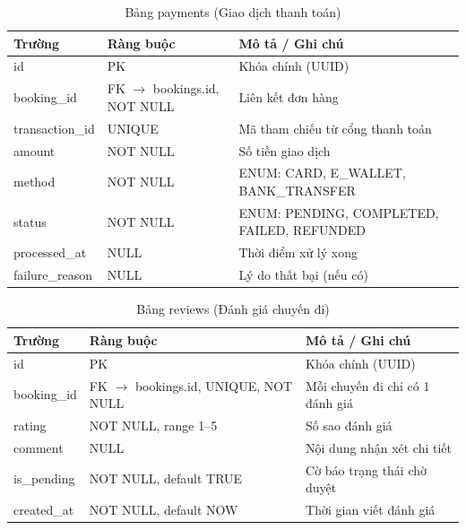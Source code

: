 \begin{longtable}{p{\colField} p{\colConst} p{\colDesc}}
    \caption{Bảng payments (Giao dịch thanh toán)} \label{tab:payments} \\
    \toprule
    \textbf{Trường} & \textbf{Ràng buộc} & \textbf{Mô tả / Ghi chú} \\
    \midrule
    \endfirsthead
    \bottomrule
    \endlastfoot

    id & PK & Khóa chính (UUID) \\
    booking\_id & FK $\to$ bookings.id, NOT NULL & Liên kết đơn hàng \\
    transaction\_id & UNIQUE & Mã tham chiếu từ cổng thanh toán \\
    amount & NOT NULL & Số tiền giao dịch \\
    method & NOT NULL & ENUM: CARD, E\_WALLET, BANK\_TRANSFER \\
    status & NOT NULL & ENUM: PENDING, COMPLETED, FAILED, REFUNDED \\
    processed\_at & NULL & Thời điểm xử lý xong \\
    failure\_reason & NULL & Lý do thất bại (nếu có) \\
\end{longtable}

\vspace{0.5cm}

\begin{longtable}{p{\colField} p{\colConst} p{\colDesc}}
    \caption{Bảng reviews (Đánh giá chuyến đi)} \label{tab:reviews} \\
    \toprule
    \textbf{Trường} & \textbf{Ràng buộc} & \textbf{Mô tả / Ghi chú} \\
    \midrule
    \endfirsthead
    \bottomrule
    \endlastfoot

    id & PK & Khóa chính (UUID) \\
    booking\_id & FK $\to$ bookings.id, UNIQUE, NOT NULL & Mỗi chuyến đi chỉ có 1 đánh giá \\
    rating & NOT NULL, range 1--5 & Số sao đánh giá \\
    comment & NULL & Nội dung nhận xét chi tiết \\
    is\_pending & NOT NULL, default TRUE & Cờ báo trạng thái chờ duyệt \\
    created\_at & NOT NULL, default NOW & Thời gian viết đánh giá \\
\end{longtable}

